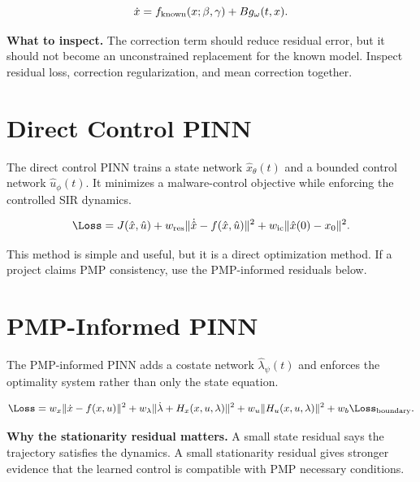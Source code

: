 \documentclass[11pt,a4paper]{article}
\begin{document}
\begin{equation}
\dot{x}=f_{\rm known}(x;\beta,\gamma)+B g_\omega(t,x).
\end{equation}

\begin{methodbox}
\textbf{What to inspect.}
The correction term should reduce residual error, but it should not become an unconstrained replacement for the known model. Inspect residual loss, correction regularization, and mean correction together.
\end{methodbox}

\section{Direct Control PINN}
The direct control PINN trains a state network \(\hat{x}_\theta(t)\) and a bounded control network \(\hat{u}_\phi(t)\). It minimizes a malware-control objective while enforcing the controlled SIR dynamics.

\begin{equation}
\Loss = J(\hat{x},\hat{u}) + w_{\rm res}\|\dot{\hat{x}}-f(\hat{x},\hat{u})\|^2 + w_{\rm ic}\|\hat{x}(0)-x_0\|^2.
\end{equation}

This method is simple and useful, but it is a direct optimization method. If a project claims PMP consistency, use the PMP-informed residuals below.

\section{PMP-Informed PINN}
The PMP-informed PINN adds a costate network \(\hat{\lambda}_\psi(t)\) and enforces the optimality system rather than only the state equation.

\begin{equation}
\Loss=w_x\|\dot{x}-f(x,u)\|^2
    +w_\lambda\|\dot{\lambda}+H_x(x,u,\lambda)\|^2
    +w_u\|H_u(x,u,\lambda)\|^2
    +w_b\Loss_{\rm boundary}.
\end{equation}

\begin{methodbox}
\textbf{Why the stationarity residual matters.}
A small state residual says the trajectory satisfies the dynamics. A small stationarity residual gives stronger evidence that the learned control is compatible with PMP necessary conditions.
\end{methodbox}
\end{document}
